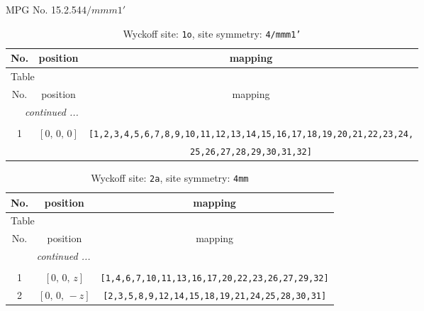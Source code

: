 \documentclass[fleqn,8pt]{jsarticle}
\begin{document}
\setcounter{MaxMatrixCols}{32}

\renewcommand{\tablename}{Table~}
\renewcommand{\figurename}{Figure~}
\begin{center}
\LARGE
MPG No. 15.2.54\quad$4/mmm1'$
\end{center}
\renewcommand{\arraystretch}{1.2}
\begin{longtable}{ccc}
\caption{Wyckoff site: {\tt 1o}, site symmetry: {\tt 4/mmm1'}}
 \\
 \hline \hline
No. & position & mapping \\ \hline \endfirsthead

\multicolumn{2}{l}{\tablename\ \thetable{}} \\
 \hline \hline
No. & position & mapping \\ \hline \endhead

 \hline \hline
\multicolumn{2}{r}{\footnotesize\it continued ...} \\ \endfoot

 \hline \hline
\multicolumn{2}{r}{} \\ \endlastfoot

1 & $\left[ 0,\, 0,\, 0 \right]$ & {\tt [1,2,3,4,5,6,7,8,9,10,11,12,13,14,15,16,17,18,19,20,21,22,23,24,} \\ \hline
 &  & {\tt 25,26,27,28,29,30,31,32]} \\
\end{longtable}
\renewcommand{\arraystretch}{1.2}
\begin{longtable}{ccc}
\caption{Wyckoff site: {\tt 2a}, site symmetry: {\tt 4mm}}
 \\
 \hline \hline
No. & position & mapping \\ \hline \endfirsthead

\multicolumn{2}{l}{\tablename\ \thetable{}} \\
 \hline \hline
No. & position & mapping \\ \hline \endhead

 \hline \hline
\multicolumn{2}{r}{\footnotesize\it continued ...} \\ \endfoot

 \hline \hline
\multicolumn{2}{r}{} \\ \endlastfoot

1 & $\left[ 0,\, 0,\, z \right]$ & {\tt [1,4,6,7,10,11,13,16,17,20,22,23,26,27,29,32]} \\ \hline
2 & $\left[ 0,\, 0,\, - z \right]$ & {\tt [2,3,5,8,9,12,14,15,18,19,21,24,25,28,30,31]} \\
\end{longtable}
\end{document}
